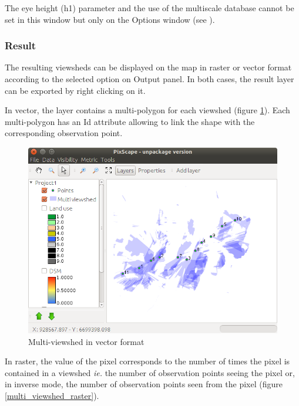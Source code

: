 \documentclass{report}
\begin{document}
The eye height (h1) parameter and the use of the multiscale database cannot be set in this window but only on the Options window (see ).

\subsubsection{Result}
The resulting viewsheds can be displayed on the map in raster or vector format according to the selected option on Output panel. In both cases, the result layer can be exported by right clicking on it.

In vector, the layer contains a multi-polygon for each viewshed (figure \ref{multi_viewshed_vector}). Each multi-polygon has an Id attribute allowing to link the shape with the corresponding observation point.

\begin{figure}[H]
	\includegraphics[scale=0.5]{img/multi_viewshed_vector-en.png} 
	\caption{Multi-viewshed in vector format}
	\label{multi_viewshed_vector}
\end{figure}

In raster, the value of the pixel corresponds to the number of times the pixel is contained in a viewshed \textit{ie.} the number of observation points seeing the pixel or, in inverse mode, the number of observation points seen from the pixel (figure \ref{multi_viewshed_raster}).
\end{document}
